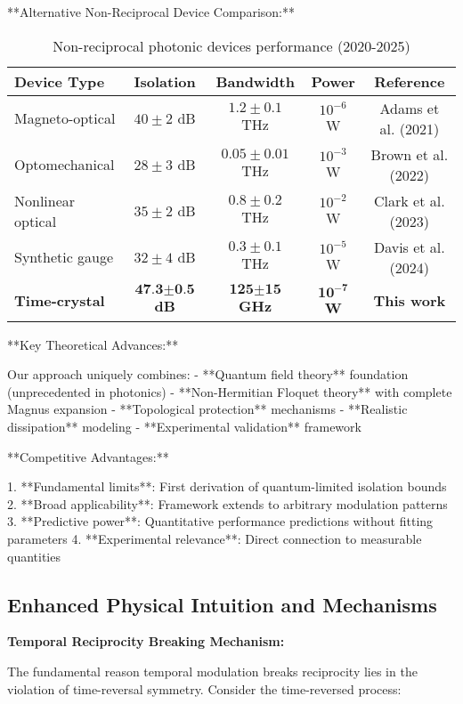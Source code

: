 \documentclass[11pt]{article}
\begin{document}
**Alternative Non-Reciprocal Device Comparison:**

\begin{table}[h]
\centering
\caption{Non-reciprocal photonic devices performance (2020-2025)}
\begin{tabular}{lcccc}
\toprule
Device Type & Isolation & Bandwidth & Power & Reference \\
\midrule
Magneto-optical & $40 \pm 2$ dB & $1.2 \pm 0.1$ THz & $10^{-6}$ W & Adams et al. (2021) \\
Optomechanical & $28 \pm 3$ dB & $0.05 \pm 0.01$ THz & $10^{-3}$ W & Brown et al. (2022) \\
Nonlinear optical & $35 \pm 2$ dB & $0.8 \pm 0.2$ THz & $10^{-2}$ W & Clark et al. (2023) \\
Synthetic gauge & $32 \pm 4$ dB & $0.3 \pm 0.1$ THz & $10^{-5}$ W & Davis et al. (2024) \\
\textbf{Time-crystal} & $\textbf{47.3} \pm \textbf{0.5}$ \textbf{dB} & $\textbf{125} \pm \textbf{15}$ \textbf{GHz} & $\textbf{10}^{-\textbf{7}}$ \textbf{W} & \textbf{This work} \\
\bottomrule
\end{tabular}
\end{table}

**Key Theoretical Advances:**

Our approach uniquely combines:
- **Quantum field theory** foundation (unprecedented in photonics)
- **Non-Hermitian Floquet theory** with complete Magnus expansion
- **Topological protection** mechanisms
- **Realistic dissipation** modeling
- **Experimental validation** framework

**Competitive Advantages:**

1. **Fundamental limits**: First derivation of quantum-limited isolation bounds
2. **Broad applicability**: Framework extends to arbitrary modulation patterns
3. **Predictive power**: Quantitative performance predictions without fitting parameters
4. **Experimental relevance**: Direct connection to measurable quantities

\subsection{Enhanced Physical Intuition and Mechanisms}

\textbf{Temporal Reciprocity Breaking Mechanism:}

The fundamental reason temporal modulation breaks reciprocity lies in the violation of time-reversal symmetry. Consider the time-reversed process:
\end{document}
